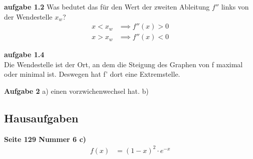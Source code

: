 \documentclass{book}
\begin{document}
\textbf{aufgabe 1.2}
Was bedutet das für den Wert der zweiten Ableitung $f''$ links von der Wendestelle $x_w$?
\begin{align*}
  x<x_w &\implies f''(x)>0\\
  x>x_w & \implies f''(x)<0
\end{align*}

\textbf{aufgabe 1.4}\\
Die Wendestelle ist der Ort, an dem die Steigung des Graphen von f maximal oder minimal ist. Deswegen hat f' dort eine Extremstelle.

\textbf{Aufgabe 2}
a) einen vorzwichenwechsel hat.
b) 

\clearpage
\subsection{Hausaufgaben}
\textbf{Seite 129 Nummer 6 c)}
\begin{align*}
  f(x)&=(1-x)^2\cdot e^{-x}\\
\end{align*}
\end{document}
